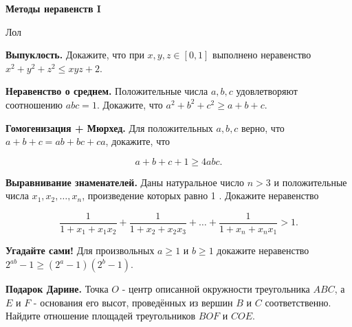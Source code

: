 \centerline{\bf \Huge Методы неравенств I}

\begin{flushright}
        \scriptsize{Лол}
\end{flushright}

\textbf{Выпуклость.}
Докажите, что при $x, y, z \in[0,1]$ выполнено неравенство $x^2+y^2+z^2 \leqslant x y z+2$.

\textbf{Неравенство о среднем.}
Положительные числа $a, b, c$ удовлетворяют соотношению $a b c=1$. Докажите, что $a^2+b^2+c^2 \geqslant a+b+c$.

\textbf{Гомогенизация + Мюрхед.}
Для положительных $a, b, c$ верно, что $a+b+c=a b+b c+c a$, докажите, что

$$
a+b+c+1 \geqslant 4 a b c .
$$

\textbf{Выравнивание знаменателей.}
Даны натуральное число $n>3$ и положительные числа $x_1, x_2, \ldots, x_n$, произведение которых равно 1 . Докажите неравенство

$$
\frac{1}{1+x_1+x_1 x_2}+\frac{1}{1+x_2+x_2 x_3}+\ldots+\frac{1}{1+x_n+x_n x_1}>1 .
$$

\textbf{Угадайте сами!}
Для произвольных $a \geqslant 1$ и $b \geqslant 1$ докажите неравенство $2^{a b}-1 \geqslant\left(2^a-1\right)\left(2^b-1\right)$.

\textbf{Подарок Дарине.}
Точка $O$ - центр описанной окружности треугольника $A B C$, а $E$ и $F$ - основания его высот, проведённых из вершин $B$ и $C$ соответственно. Найдите отношение площадей треугольников $B O F$ и $C O E$.